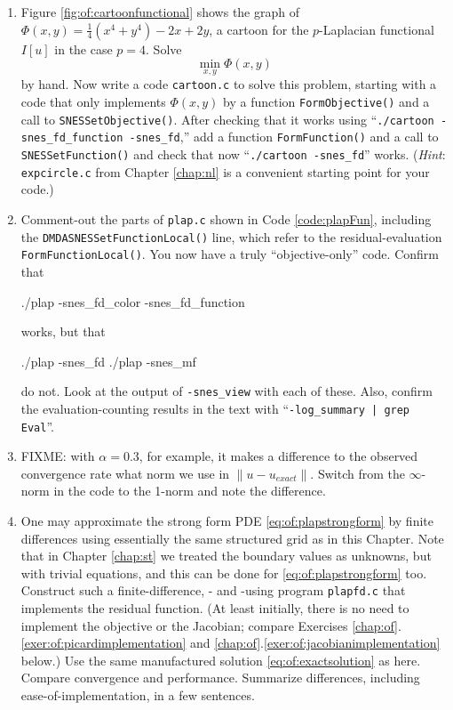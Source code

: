 \begin{enumerate}
\item Figure \ref{fig:of:cartoonfunctional} shows the graph of $\Phi(x,y)=\tfrac{1}{4}(x^4+y^4) - 2x + 2y$, a cartoon for the $p$-Laplacian functional $I[u]$ in the case $p=4$.  Solve
    $$\min_{x,y} \Phi(x,y)$$
by hand.  Now write a \PETSc code \texttt{cartoon.c} to solve this problem, starting with a code that only implements $\Phi(x,y)$ by a function \texttt{FormObjective()} and a call to \texttt{SNESSetObjective()}.  After checking that it works using ``\texttt{./cartoon -snes\_fd\_function -snes\_fd},'' add a function \texttt{FormFunction()} and a call to \texttt{SNESSetFunction()} and check that now ``\texttt{./cartoon -snes\_fd}'' works.  (\emph{Hint}:  \texttt{expcircle.c} from Chapter \ref{chap:nl} is a convenient starting point for your code.)

\item \label{exer:of:commentoutresidual}  Comment-out the parts of \texttt{plap.c} shown in Code \ref{code:plapFun}, including the \texttt{DMDASNESSetFunctionLocal()} line, which refer to the residual-evaluation \texttt{FormFunctionLocal()}.  You now have a truly ``objective-only'' code.  Confirm that
\begin{cline}
./plap -snes_fd_color -snes_fd_function
\end{cline}
works, but that
\begin{cline}
./plap -snes_fd
./plap -snes_mf
\end{cline}
do not.  Look at the output of \texttt{-snes\_view} with each of these.  Also, confirm the evaluation-counting results in the text with ``\texttt{-log\_summary | grep Eval}''.

\item FIXME: with $\alpha=0.3$, for example, it makes a difference to the observed convergence rate what norm we use in $\|u-u_{exact}\|$.  Switch from the $\infty$-norm in the code to the 1-norm and note the difference.

\item One may approximate the strong form PDE \eqref{eq:of:plapstrongform} by finite differences using essentially the same structured grid as in this Chapter.  Note that in Chapter \ref{chap:st} we treated the boundary values as unknowns, but with trivial equations, and this can be done for \eqref{eq:of:plapstrongform} too.  Construct such a finite-difference, \pSNES- and \pDMDA-using program \texttt{plapfd.c} that implements the residual function.  (At least initially, there is no need to implement the objective or the Jacobian; compare Exercises \ref{chap:of}.\ref{exer:of:picardimplementation} and \ref{chap:of}.\ref{exer:of:jacobianimplementation} below.)  Use the same manufactured solution \eqref{eq:of:exactsolution} as here.  Compare convergence and performance.  Summarize differences, including ease-of-implementation, in a few sentences.


\end{enumerate}
